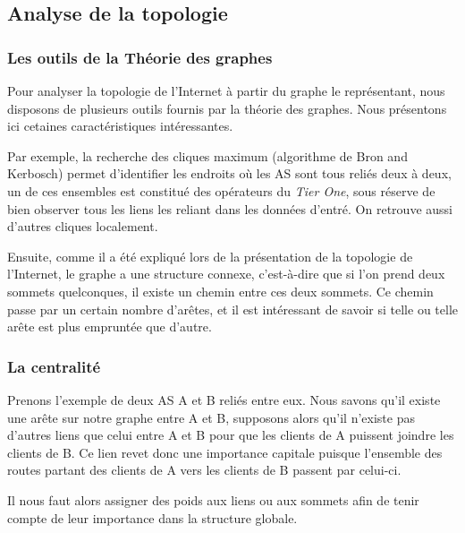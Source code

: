 

%

\subsection{Analyse de la topologie}

\subsubsection{Les outils de la Th\'eorie des graphes}
\par
Pour analyser la topologie de l'Internet \`a partir du graphe le repr\'esentant, nous disposons de plusieurs outils fournis par la th\'eorie des graphes. Nous pr\'esentons ici cetaines caract\'eristiques int\'eressantes.

Par exemple, la recherche des cliques maximum (algorithme de Bron and Kerbosch) permet d'identifier les endroits o\`u les AS sont tous reli\'es deux \`a deux, un de ces ensembles est constitu\'e des op\'erateurs du \textit{Tier One}, sous r\'eserve de bien observer tous les liens les reliant dans les donn\'ees d'entr\'e. On retrouve aussi d'autres cliques localement.
\par
Ensuite, comme il a été expliqu\'e lors de la pr\'esentation de la topologie de l'Internet, le graphe a une structure connexe, c'est-\`a-dire que si l'on prend deux sommets quelconques, il existe un chemin entre ces deux sommets.
Ce chemin passe par un certain nombre d'ar\^etes, et il est int\'eressant de savoir si telle ou telle ar\^ete est plus emprunt\'ee que d'autre.

\subsubsection{La centralit\'e}

\par
Prenons l'exemple de deux AS A et B reli\'es entre eux. Nous savons qu'il existe une ar\^ete sur notre graphe entre A et B, supposons alors qu'il n'existe pas d'autres liens que celui entre A et B pour que les clients de A puissent joindre les clients de B. Ce lien revet donc une importance capitale puisque l'ensemble des routes partant des clients de A vers les clients de B passent par celui-ci.
\par
Il nous faut alors assigner des poids aux liens ou aux sommets afin de tenir compte de leur importance dans la structure globale.

